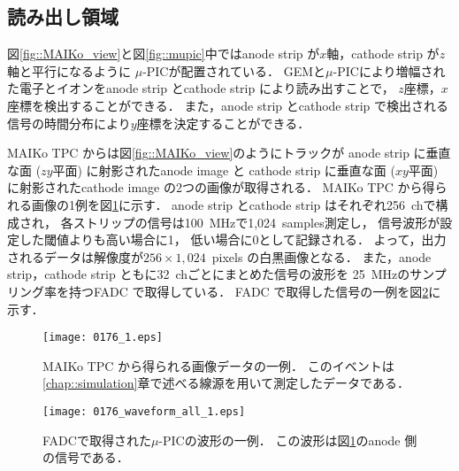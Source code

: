 \documentclass[../master]{subfiles}
\begin{document}
\subsection{読み出し領域}
\label{sec::mu-pic}
図\ref{fig::MAIKo_view}と図\ref{fig::mupic}中ではanode strip が$x$軸，cathode strip が$z$軸と平行になるように
$\mu$-PICが配置されている．
GEMと$\mu$-PICにより増幅された電子とイオンをanode strip とcathode strip により読み出すことで，
$z$座標，$x$座標を検出することができる．
また，anode strip とcathode strip で検出される信号の時間分布により$y$座標を決定することができる．

MAIKo TPC からは図\ref{fig::MAIKo_view}のようにトラックが
anode strip に垂直な面 ($zy$平面) に射影されたanode image と
cathode strip に垂直な面 ($xy$平面) に射影されたcathode image の2つの画像が取得される．
MAIKo TPC から得られる画像の1例を図\ref{fig::track_demo}に示す．
anode strip とcathode strip はそれぞれ256~chで構成され，
各ストリップの信号は\SI{100}{\mega\hertz}で1,024~samples測定し，
信号波形が設定した閾値よりも高い場合に1，
低い場合に0として記録される．
よって，出力されるデータは解像度が$256\times1,024$~pixels の白黒画像となる．
また，anode strip，cathode strip ともに32~chごとにまとめた信号の波形を
\SI{25}{\mega\hertz}のサンプリング率を持つFADC で取得している．
FADC で取得した信号の一例を図\ref{fig::FADC_waveform}に示す．
\begin{figure}
  \centering
  \texttt{[image: 0176\_1.eps]}
  \caption[MAIKo TPC から得られる画像データの一例．]
          {MAIKo TPC から得られる画像データの一例．
          このイベントは\ref{chap::simulation}章で述べる線源を用いて測定したデータである．}
  \label{fig::track_demo}
\end{figure}
\begin{figure}
  \centering
  \texttt{[image: 0176\_waveform\_all\_1.eps]}
  \caption[FADCで取得された$\mu$-PICの波形の一例．]
          {FADCで取得された$\mu$-PICの波形の一例．
          この波形は図\ref{fig::track_demo}のanode 側の信号である．}
  \label{fig::FADC_waveform}
\end{figure}
\end{document}
